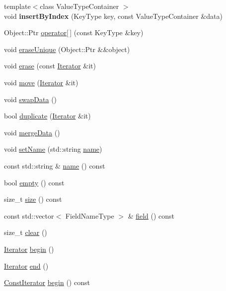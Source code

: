 \begin{DoxyCompactItemize}
{\footnotesize template$<$class Value\+Type\+Container $>$ }\\void {\bfseries insert\+By\+Index} (Key\+Type key, const Value\+Type\+Container \&data)
\item 
Object\+::\+Ptr \hyperlink{class_table_a71ca4f3dfa88d0b057cd63920c5028e9}{operator\mbox{[}$\,$\mbox{]}} (const Key\+Type \&key)
\item 
void \hyperlink{class_table_ad0e71468c62bca660627296be71dc590}{erase\+Unique} (Object\+::\+Ptr \&\&object)
\item 
void \hyperlink{class_table_a9597c9976c3b83f757171f44c4101120}{erase} (const \hyperlink{class_table_1_1_iterator_impl}{Iterator} \&it)
\item 
void \hyperlink{class_table_a2c4dc9ae2d3c20e2b20fab04b996ccc4}{move} (\hyperlink{class_table_1_1_iterator_impl}{Iterator} \&it)
\item 
void \hyperlink{class_table_ae064a04cc7772a51f163f81f0187446e}{swap\+Data} ()
\item 
bool \hyperlink{class_table_aa7b2e954e0631acf5fbfe3e801eca1e3}{duplicate} (\hyperlink{class_table_1_1_iterator_impl}{Iterator} \&it)
\item 
void \hyperlink{class_table_a3b94156f321448e74ad74b0276ca1a32}{merge\+Data} ()
\item 
void \hyperlink{class_table_aaee2603a21e2ad0de4e073ada88e4b8d}{set\+Name} (std\+::string \hyperlink{class_table_aac2cc68c2c50c66f7de7656fa495fc2a}{name})
\item 
const std\+::string \& \hyperlink{class_table_aac2cc68c2c50c66f7de7656fa495fc2a}{name} () const
\item 
bool \hyperlink{class_table_abb7690114d028b87e337540f42780cbb}{empty} () const
\item 
size\+\_\+t \hyperlink{class_table_aec548eba07f9b3aebcde324c19e19fde}{size} () const
\item 
const std\+::vector$<$ Field\+Name\+Type $>$ \& \hyperlink{class_table_ab68bc133d1d01f516d0bfb1a9c06e40f}{field} () const
\item 
size\+\_\+t \hyperlink{class_table_af94164c4dde76690be6b7f3a1d5e7733}{clear} ()
\item 
\hyperlink{class_table_1_1_iterator_impl}{Iterator} \hyperlink{class_table_a9df56e33923bbff648f98367d723ddb5}{begin} ()
\item 
\hyperlink{class_table_1_1_iterator_impl}{Iterator} \hyperlink{class_table_a5b5c1e536a44af329e2a9e35e469fde7}{end} ()
\item 
\hyperlink{class_table_1_1_iterator_impl}{Const\+Iterator} \hyperlink{class_table_a8b9f35b26e064b9104afcdc804e05883}{begin} () const

\end{DoxyCompactItemize}
